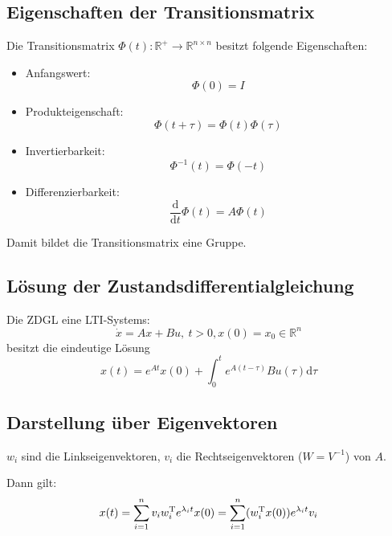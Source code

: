 \subsection{Eigenschaften der Transitionsmatrix}
Die Transitionsmatrix $\Phi(t): \mathbb{R}^+ \to \mathbb{R}^{n \times n}$ besitzt folgende
Eigenschaften:
\begin{itemize}
    \item Anfangswert:
        \begin{equation}
            \Phi(0) = I
        \end{equation}
    \item Produkteigenschaft:
        \begin{equation}
            \Phi(t + \tau) = \Phi(t) \Phi(\tau)
        \end{equation}
    \item Invertierbarkeit:
        \begin{equation}
            \Phi^{-1}(t) = \Phi(-t) 
        \end{equation}
    \item Differenzierbarkeit:
        \begin{equation}
            \frac{\text{d}}{\text{d}t} \Phi(t) = A \Phi(t)
        \end{equation}
\end{itemize}
Damit bildet die Transitionsmatrix eine Gruppe.

\subsection{Lösung der Zustandsdifferentialgleichung}
Die ZDGL eine LTI-Systems:
\begin{equation}
    \dot{x} = Ax + Bu,\ t>0, x(0) = x_0 \in \mathbb{R}^n
\end{equation}
besitzt die eindeutige Lösung
\begin{equation}
    x(t) = e^{A t} x(0) + \int_0^t e^{A (t-\tau)} B u(\tau) \text{d}\tau
\end{equation}

\subsection{Darstellung über Eigenvektoren}
$w_i$ sind die Linkseigenvektoren, $v_i$ die Rechtseigenvektoren ($W=V^{-1}$) von $A$.

Dann gilt:
\begin{equation}
    x(t) = \sum_{i=1}^n v_i w_i^\text{T} e^{\lambda_i t} x(0)
        = \sum_{i=1}^n (w_i^\text{T} x(0)) e^{\lambda_i t} v_i
\end{equation}

